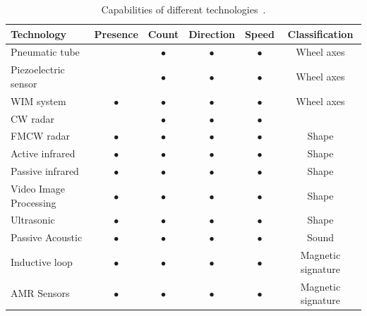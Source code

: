 \begin{table}[!f]
\centering
\caption[Capabilities of different technologies]{Capabilities of different technologies~\cite{path2007}.}
\begin{tabular}{lccccc}\toprule
	\textbf{Technology} 	& \textbf{Presence} & \textbf{Count} & \textbf{Direction} & \textbf{Speed} & \textbf{Classification}\\\midrule
	Pneumatic tube		&		& $\bullet$	& $\bullet$	& $\bullet$	& Wheel axes\\
	Piezoelectric sensor	&		& $\bullet$	& $\bullet$	& $\bullet$	& Wheel axes\\
	WIM system		& $\bullet$	& $\bullet$	& $\bullet$	& $\bullet$	& Wheel axes\\
	CW radar		& 		& $\bullet$	& $\bullet$	& $\bullet$	& \\
	FMCW radar		& $\bullet$	& $\bullet$	& $\bullet$	& $\bullet$	& Shape\\
	Active infrared		& $\bullet$	& $\bullet$	& $\bullet$	& $\bullet$	& Shape\\
	Passive infrared	& $\bullet$	& $\bullet$	& $\bullet$	& $\bullet$	& Shape\\
	Video Image Processing 	& $\bullet$	& $\bullet$	& $\bullet$	& $\bullet$	& Shape\\
	Ultrasonic		& $\bullet$	& $\bullet$	& $\bullet$	& $\bullet$	& Shape\\
	Passive Acoustic	& $\bullet$	& $\bullet$	& $\bullet$	& $\bullet$	& Sound\\
	Inductive loop		& $\bullet$	& $\bullet$	& $\bullet$	& $\bullet$	& Magnetic signature\\ 
	AMR Sensors		& $\bullet$	& $\bullet$	& $\bullet$	& $\bullet$	& Magnetic signature\\ \bottomrule
\end{tabular} 
\label{tbl:techs}
\end{table} 

